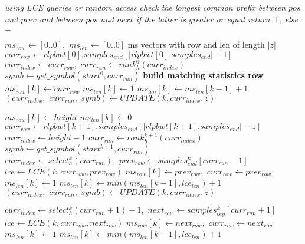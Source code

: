 \begin{algorithm}
  \begin{algorithmic}
    \State \textit{using LCE queries or random access check the longest common
    prefix between $pos$ and $prev$ and between $pos$ and $next$}
    \State \textit{if the latter is greater or equal return $\top$, else $\bot$}
    \EndFunction
  \end{algorithmic}
\end{algorithm}
\begin{algorithm}
  \scriptsize
  \begin{algorithmic}[1]
    \State $ms_{row}\gets [0..0],\,\,ms_{len}\gets [0..0]$
    \Comment ms vectors with row and len of length $|z|$
    \State $curr_{row}\gets
    rlpbwt[0].samples_{end}[|rlpbwt[0].samples_{end}|-1]$
    \State $curr_{index}\gets curr_{row},\,\,curr_{run}\gets
    rank_h^0(curr_{index})$ 
    \State $symb\gets get\_symbol(start^0, curr_{run})$
    \Comment \textbf{build matching statistics row}
    \For {\textit{every} $k\in[0, |z|)$}
    \State $ms_{row}[k]\gets curr_{row}$
    \State $ms_{len}[k] \gets 1$
    \Else
    \State $ms_{len}[k] \gets ms_{len}[k-1]+1$
    \EndIf
     \State $(curr_{index},\,\,curr_{run},\,\,symb)\gets UPDATE(k, curr_{index},
    z)$ 
    \EndIf
    \Else
    
    \State $ms_{row}[k]\gets height$
    \State $ms_{len}[k]\gets 0$
    \State $curr_{row}\gets
    rlpbwt[k+1].samples_{end}[|rlpbwt[k+1].samples_{end}|-1]$
    \State $curr_{index}\gets height-1$
    \State $curr_{run}\gets rank_h^{k+1}(curr_{index})$
    \State $symb\gets get\_symbol(start^{k+1}, curr_{run})$
    \EndIf
    \Else
    \State $curr_{index}\gets select_h^k(curr_{run}),\,\,prev_{row}\gets
    samples_{end}^k[curr_{run}-1]$ 
    \State $lce\gets LCE(k, curr_{row}, prev_{row})$
    \State $ms_{row}[k]\gets prev_{row},\,\,curr_{row}\gets prev_{row}$
    \State $ms_{len}[k] \gets 1$
    \Else
    \State $ms_{len}[k] \gets min(ms_{len}[k-1], lce_{len})+1$
    \EndIf
    \State $(curr_{index},\,\,curr_{run},\,\,symb)\gets UPDATE(k, curr_{index},
    z)$  
    \EndIf
    
    \State $curr_{index}\gets select_h^k(curr_{run}+1)+1,\,\,next_{row}\gets
    samples_{beg}^k[curr_{run}+1]$ 
    \State $lce\gets LCE(k, curr_{row}, next_{row})$
    \State $ms_{row}[k]\gets next_{row},\,\,curr_{row}\gets next_{row}$
    \State $ms_{len}[k] \gets 1$
    \Else
    \State $ms_{len}[k] \gets min(ms_{len}[k-1], lce_{len})+1$
    \EndIf
  

\end{algorithmic}
\end{algorithm}
